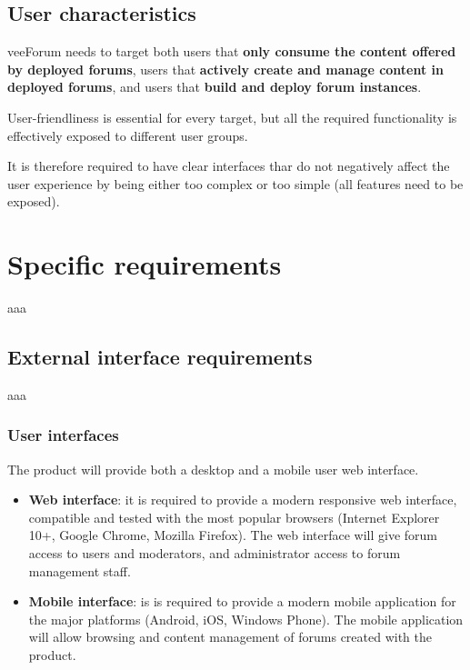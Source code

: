 \documentclass[12pt]{report}
\renewcommand\emph{\textbf}
\begin{document}
                \subsection{User characteristics}
                    veeForum needs to target both users that \emph{only consume the content offered by deployed forums}, users that \emph{actively create and manage content in deployed forums}, and users that \emph{build and deploy forum instances}.

                    User-friendliness is essential for every target, but all the required functionality is effectively exposed to different user groups.

                    It is therefore required to have clear interfaces thar do not negatively affect the user experience by being either too complex or too simple (all features need to be exposed).

            \section{Specific requirements}
                aaa

                \subsection{External interface requirements}
                    aaa

                    \subsubsection{User interfaces}
                        The product will provide both a desktop and a mobile user web interface.

                        \begin{itemize}
                            \item \emph{Web interface}: it is required to provide a modern responsive web interface, compatible and tested with the most popular browsers (Internet Explorer 10+, Google Chrome, Mozilla Firefox). The web interface will give forum access to users and moderators, and administrator access to forum management staff.
                            \item \emph{Mobile interface}: is is required to provide a modern mobile application for the major platforms (Android, iOS, Windows Phone). The mobile application will allow browsing and content management of forums created with the product.
                        \end{itemize}
\end{document}

